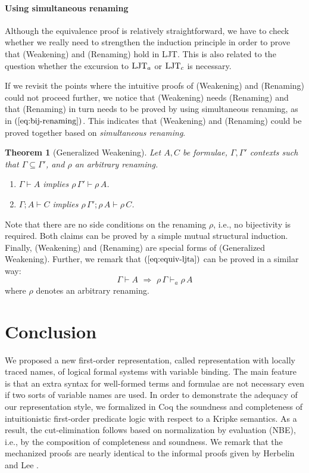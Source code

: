 \documentclass{svjour3}                     %
\newtheorem{thm}{Theorem}%
\newcommand{\Ga}{\Gamma}
\newcommand{\vd}{\vdash}
\newcommand{\tm}{\subseteq}
\newcommand{\scol}{\mathop{;}}
\newcommand{\ljt}{\textup{LJT}}
\newcommand{\vda}{\vdash_{\!\!\!a}}
\begin{document}
\paragraph{\bf Using simultaneous renaming}
Although the equivalence proof is relatively straightforward, we have to check whether we really need to strengthen the induction principle in order to prove that (Weakening) and (Renaming) hold in LJT. This is also related to the question whether the excursion to $\ljt_a$ or $\ljt_c$ is necessary.

If we revisit the points where the intuitive proofs of (Weakening) and
(Renaming) could not proceed further, we notice that (Weakening) needs
(Renaming) and that (Renaming) in turn needs to be proved by using
simultaneous renaming, as in $(\ref{eq:bij-renaming})$. This indicates
that (Weakening) and (Renaming) could be proved together based on \textit{simultaneous renaming}. 

\begin{thm}[Generalized Weakening]\label{gen-weakening}
    Let $A, C$ be formulae, $\Ga, \Ga'$ contexts such that $\Ga \tm \Ga'$, and $\rho$ an arbitrary renaming.
  \begin{enumerate}
  \item $\Ga \vd A$ implies $\rho\, \Ga' \vd \rho\, A$.
  \item $\Ga \scol A \vd C$ implies $\rho\, \Ga' \scol \rho\, A \vd \rho\, C$.
  \end{enumerate}
\end{thm}
Note that there are no side conditions on the renaming $\rho$, i.e., no
bijectivity is required. Both claims can be proved by a simple mutual structural induction. Finally, (Weakening) and (Renaming) are special forms of (Generalized Weakening).
Further, we remark that $(\ref{eq:equiv-ljta})$ can be proved in a similar way:
\begin{equation*}
  \label{eq:equiv-ljta1}
  \Ga \vd A \,\,\Rightarrow\,\, \rho\, \Ga \vda \rho\, A  
\end{equation*}
where $\rho$ denotes an arbitrary renaming.

\section{Conclusion}\label{sec:conclusion}
We proposed a new first-order representation, called representation with locally traced names, of logical formal systems with variable binding. 
The main feature is that an extra syntax for well-formed terms and formulae are not necessary even if two sorts of variable names are used.
In order to demonstrate the adequacy of our representation style, we formalized in Coq the soundness and completeness of intuitionistic first-order predicate logic with respect to a Kripke semantics. As a result, the cut-elimination follows based on normalization by evaluation (NBE), i.e., by the composition of completeness and soundness. We remark that the mechanized proofs are nearly identical to the informal proofs given by Herbelin and Lee \cite{wollic09}.
\end{document}
